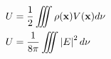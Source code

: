 \begin{align*}
	U &= \frac{1}{2} \iiint \rho({\bf x})V({\bf x}) d\nu \\
	U &= \frac{1}{8\pi} \iiint \left|E\right|^2 d\nu
\end{align*}
